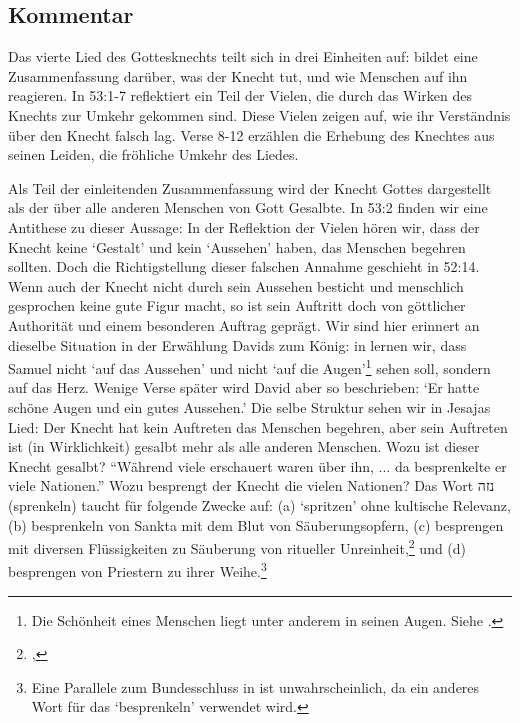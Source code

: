 \subsection{Kommentar}
Das vierte Lied des Gottesknechts teilt sich in drei Einheiten auf:  bildet eine Zusammenfassung darüber, was der Knecht tut, und wie Menschen auf ihn reagieren.
In 53:1-7 reflektiert ein Teil der Vielen, die durch das Wirken des Knechts zur Umkehr gekommen sind.
Diese Vielen zeigen auf, wie ihr Verständnis über den Knecht falsch lag.
Verse 8-12 erzählen die Erhebung des Knechtes aus seinen Leiden, die fröhliche Umkehr des Liedes.

Als Teil der einleitenden Zusammenfassung wird der Knecht Gottes dargestellt als der über alle anderen Menschen von Gott Gesalbte.
In 53:2 finden wir eine Antithese zu dieser Aussage: In der Reflektion der Vielen hören wir, dass der Knecht keine `Gestalt' und kein `Aussehen' haben, das Menschen begehren sollten.
Doch die Richtigstellung dieser falschen Annahme geschieht in 52:14.
Wenn auch der Knecht nicht durch sein Aussehen besticht und menschlich gesprochen keine gute Figur macht,
so ist sein Auftritt doch von göttlicher Authorität und einem besonderen Auftrag geprägt.
Wir sind hier erinnert an dieselbe Situation in der Erwählung Davids zum König: in  lernen wir,
dass Samuel nicht `auf das Aussehen' und nicht `auf die Augen'\footnote{
	Die Schönheit eines Menschen liegt unter anderem in seinen Augen. Siehe .
} sehen soll, sondern auf das Herz. Wenige Verse später wird David aber so beschrieben: `Er hatte schöne Augen und ein gutes Aussehen.'
Die selbe Struktur sehen wir in Jesajas Lied: Der Knecht hat kein Auftreten das Menschen begehren, aber sein Auftreten ist (in Wirklichkeit) gesalbt mehr als alle anderen Menschen.
Wozu ist dieser Knecht gesalbt?
``Während viele erschauert waren über ihn, ... da besprenkelte er viele Nationen.''
Wozu besprengt der Knecht die vielen Nationen? Das Wort נזה (sprenkeln) taucht für folgende Zwecke auf:
(a) `spritzen' ohne kultische Relevanz,
(b) besprenkeln von Sankta mit dem Blut von Säuberungsopfern,
(c) besprengen mit diversen Flüssigkeiten zu Säuberung von ritueller Unreinheit,\footnote{, } und
(d) besprengen von Priestern zu ihrer Weihe.\footnote{Eine Parallele zum Bundesschluss in  ist unwahrscheinlich, da ein anderes Wort für das `besprenkeln' verwendet wird.}
